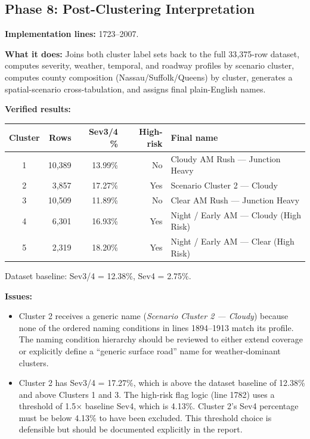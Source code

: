 \documentclass[11pt]{article}
\begin{document}
\subsection{Phase 8: Post-Clustering Interpretation}

\textbf{Implementation lines:} 1723--2007.

\textbf{What it does:} Joins both cluster label sets back to the full 33{,}375-row
dataset, computes severity, weather, temporal, and roadway profiles by scenario
cluster, computes county composition (Nassau/Suffolk/Queens) by cluster, generates
a spatial-scenario cross-tabulation, and assigns final plain-English names.

\textbf{Verified results:}

\begin{center}
\begin{tabular}{|c|r|r|r|l|}
\hline
Cluster & Rows & Sev3/4 \% & High-risk & Final name \\
\hline
1 & 10{,}389 & 13.99\% & No & Cloudy AM Rush --- Junction Heavy \\
2 & 3{,}857  & 17.27\% & Yes & Scenario Cluster 2 --- Cloudy \\
3 & 10{,}509 & 11.89\% & No & Clear AM Rush --- Junction Heavy \\
4 & 6{,}301  & 16.93\% & Yes & Night / Early AM --- Cloudy (High Risk) \\
5 & 2{,}319  & 18.20\% & Yes & Night / Early AM --- Clear (High Risk) \\
\hline
\end{tabular}
\end{center}

Dataset baseline: Sev3/4 = 12.38\%, Sev4 = 2.75\%.

\textbf{Issues:}
\begin{itemize}
\item Cluster 2 receives a generic name (\textit{Scenario Cluster 2 --- Cloudy})
  because none of the ordered naming conditions in lines 1894--1913 match its
  profile. The naming condition hierarchy should be reviewed to either extend
  coverage or explicitly define a ``generic surface road'' name for
  weather-dominant clusters.
\item Cluster 2 has Sev3/4 = 17.27\%, which is above the dataset baseline of
  12.38\% and above Clusters 1 and 3. The high-risk flag logic (line 1782)
  uses a threshold of 1.5$\times$ baseline Sev4, which is 4.13\%. Cluster 2's
  Sev4 percentage must be below 4.13\% to have been excluded. This threshold
  choice is defensible but should be documented explicitly in the report.
\end{itemize}
\end{document}
